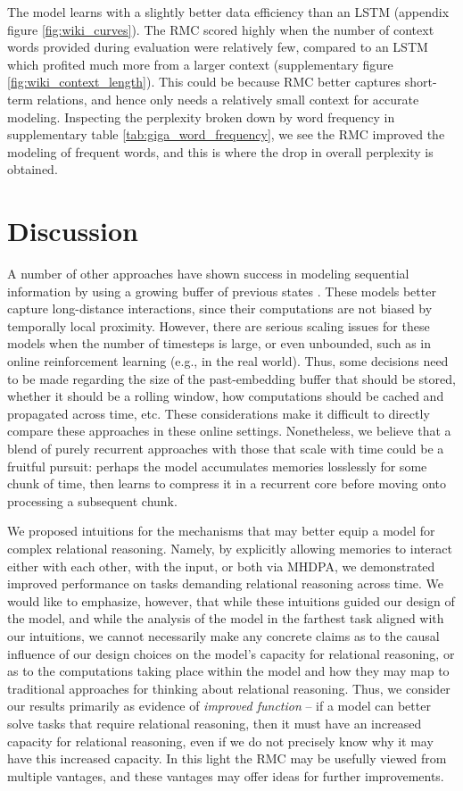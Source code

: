 \documentclass{article}
\begin{document}
The model learns with a slightly better data efficiency than an LSTM (appendix figure \ref{fig:wiki_curves}). The RMC scored highly when the number of context words provided during evaluation were relatively few, compared to an LSTM which profited much more from a larger context (supplementary figure \ref{fig:wiki_context_length}). This could be because RMC better captures short-term relations, and hence only needs a relatively small context for accurate modeling. Inspecting the perplexity broken down by word frequency in supplementary table \ref{tab:giga_word_frequency}, we see the RMC improved the modeling of frequent words, and this is where the drop in overall perplexity is obtained.  \section{Discussion}
A number of other approaches have shown success in modeling sequential information by using a growing buffer of previous states \citep{BahdanauCB14, vaswani2017attention}. These models better capture long-distance interactions, since their computations are not biased by temporally local proximity. However, there are serious scaling issues for these models when the number of timesteps is large, or even unbounded, such as in online reinforcement learning (e.g., in the real world). Thus, some decisions need to be made regarding the size of the past-embedding buffer that should be stored, whether it should be a rolling window, how computations should be cached and propagated across time, etc. These considerations make it difficult to directly compare these approaches in these online settings. Nonetheless, we believe that a blend of purely recurrent approaches with those that scale with time could be a fruitful pursuit: perhaps the model accumulates memories losslessly for some chunk of time, then learns to compress it in a recurrent core before moving onto processing a subsequent chunk. 

We proposed intuitions for the mechanisms that may better equip a model for complex relational reasoning. Namely, by explicitly allowing memories to interact either with each other, with the input, or both via MHDPA, we demonstrated improved performance on tasks demanding relational reasoning across time. We would like to emphasize, however, that while these intuitions guided our design of the model, and while the analysis of the model in the  farthest task aligned with our intuitions, we cannot necessarily make any concrete claims as to the causal influence of our design choices on the model's capacity for relational reasoning, or as to the computations taking place within the model and how they may map to traditional approaches for thinking about relational reasoning. Thus, we consider our results primarily as evidence of \textit{improved function} -- if a model can better solve tasks that require relational reasoning, then it must have an increased capacity for relational reasoning, even if we do not precisely know why it may have this increased capacity. In this light the RMC may be usefully viewed from multiple vantages, and these vantages may offer ideas for further improvements. 
\end{document}
